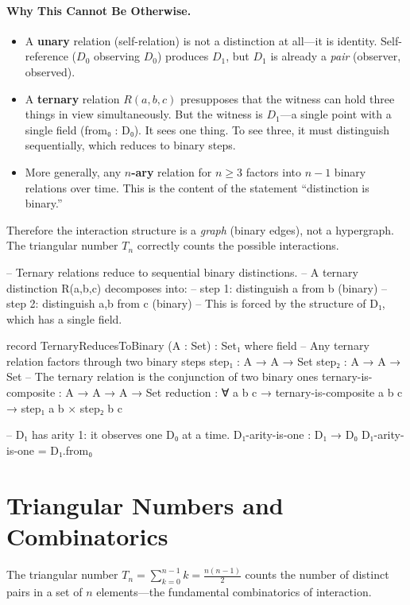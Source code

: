 \documentclass[11pt,a4paper]{book}
\def\texttt#1{#1}%
\begin{document}
\paragraph{Why This Cannot Be Otherwise.}
\begin{itemize}
\item A \textbf{unary} relation (self-relation) is not a distinction at all---it is 
identity. Self-reference ($D_0$ observing $D_0$) produces $D_1$, but $D_1$ is 
already a \emph{pair} (observer, observed).
\item A \textbf{ternary} relation $R(a,b,c)$ presupposes that the witness can hold 
three things in view simultaneously. But the witness is $D_1$---a single point with a 
single field (\texttt{from₀ : D₀}). It sees one thing. To see three, it must 
distinguish sequentially, which reduces to binary steps.
\item More generally, any \textbf{$n$-ary} relation for $n \geq 3$ factors into 
$n - 1$ binary relations over time. This is the content of the statement ``distinction 
is binary.''
\end{itemize}

Therefore the interaction structure is a \emph{graph} (binary edges), not a hypergraph. 
The triangular number $T_n$ correctly counts the possible interactions.

\begin{code}
-- Ternary relations reduce to sequential binary distinctions.
-- A ternary distinction R(a,b,c) decomposes into:
--   step 1: distinguish a from b  (binary)
--   step 2: distinguish {a,b} from c  (binary)
-- This is forced by the structure of D₁, which has a single field.

record TernaryReducesToBinary (A : Set) : Set₁ where
  field
    -- Any ternary relation factors through two binary steps
    step₁ : A → A → Set
    step₂ : A → A → Set
    -- The ternary relation is the conjunction of two binary ones
    ternary-is-composite : A → A → A → Set
    reduction : ∀ a b c → ternary-is-composite a b c → step₁ a b × step₂ b c

-- D₁ has arity 1: it observes one D₀ at a time.
D₁-arity-is-one : D₁ → D₀
D₁-arity-is-one = D₁.from₀
\end{code}

\section{Triangular Numbers and Combinatorics}

The triangular number $T_n = \sum_{k=0}^{n-1} k = \frac{n(n-1)}{2}$ counts the number of distinct pairs in a set of $n$ elements—the fundamental combinatorics of interaction.
\end{document}
